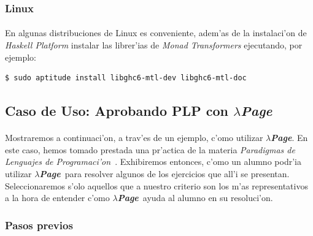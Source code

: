 \documentclass[a4paper]{article}
\newcommand{\hpage}{\textbf{\textsl{$\lambda$Page}}}
\begin{document}
\subsubsection{Linux}
\paragraph{}En algunas distribuciones de Linux es conveniente, adem'as de la instalaci'on de \textsl{Haskell Platform} instalar las librer'ias de \textit{Monad Transformers} ejecutando, por ejemplo:
\begin{center}\begin{lstlisting}
$ sudo aptitude install libghc6-mtl-dev libghc6-mtl-doc
\end{lstlisting}\end{center}
\newpage
\subsection{Caso de Uso: Aprobando PLP con \hpage}
\begin{epigraphs}
\end{epigraphs}
\paragraph{}Mostraremos a continuaci'on, a trav'es de un ejemplo, c'omo utilizar \hpage.  En este caso, hemos tomado prestada una pr'actica de la materia \textsl{Paradigmas de Lenguajes de Programaci'on}~\cite{plp}.  Exhibiremos entonces, c'omo un alumno podr'ia utilizar \hpage\ para resolver algunos de los ejercicios que all'i se presentan.  Seleccionaremos s'olo aquellos que a nuestro criterio son los m'as representativos a la hora de entender c'omo \hpage\ ayuda al alumno en su resoluci'on.

\subsubsection{Pasos previos}
\end{document}
